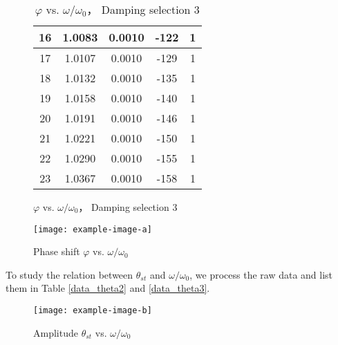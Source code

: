 \begin{figure}[H]
\begin{minipage}{0.4\textwidth}
\begin{table}[H]
\begin{tabular}{|c|c|c|c|c|}
                16 & 1.0083 & 0.0010 & -122 & 1\\\hline
                17 & 1.0107 & 0.0010 & -129 & 1\\\hline
                18 & 1.0132 & 0.0010 & -135 & 1\\\hline
                19 & 1.0158 & 0.0010 & -140 & 1\\\hline
                20 & 1.0191 & 0.0010 & -146 & 1\\\hline
                21 & 1.0221 & 0.0010 & -150 & 1\\\hline
                22 & 1.0290 & 0.0010 & -155 & 1\\\hline
                23 & 1.0367 & 0.0010 & -158 & 1\\\hline
            \end{tabular}
            \caption{$\varphi$ vs. $\omega/\omega_0$， Damping selection 3}\label{data_phi3}
        \end{table}
    \end{minipage}
    \end{figure}

    \begin{figure}[H]
    \centering
        \texttt{[image: example-image-a]}
        \caption{Phase shift $\varphi$ vs. $\omega/\omega_0$}\label{phi}
    \end{figure}


    To study the relation between $\theta_{st}$ and $\omega/\omega_0$, we process the raw data and list them in Table \ref{data_theta2} and \ref{data_theta3}.


    \begin{figure}[H]
    \centering
        \texttt{[image: example-image-b]}
        \caption{Amplitude $\theta_{st}$ vs. $\omega/\omega_0$}\label{theta}
    \end{figure}

